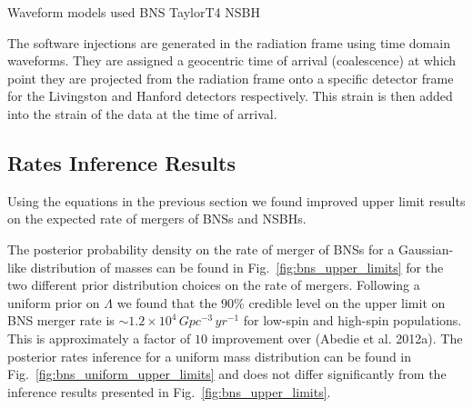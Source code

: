 
Waveform models used
BNS TaylorT4
NSBH 

The software injections are generated in the radiation frame using time domain waveforms. They are assigned a geocentric time of arrival (coalescence) at which point they are projected from the radiation frame onto a specific detector frame for the Livingston and Hanford detectors respectively. This strain is then added into the strain of the data at the time of arrival. 

\subsection{Rates Inference Results}
Using the equations in the previous section we found improved upper limit results on the expected rate of mergers of BNSs and NSBHs.

The posterior probability density on the rate of merger of BNSs for a Gaussian-like distribution of masses can be found in Fig.~\ref{fig:bns_upper_limits} for the two different prior distribution choices on the rate of mergers. Following a uniform prior on $\Lambda$ we found that the $90\%$ credible level on the upper limit on BNS merger rate is $\sim 1.2 \times 10^4 \, Gpc^{−3} \, yr^{−1}$ for low-spin and high-spin populations. This is approximately a factor of $10$ improvement over (Abedie et al. 2012a). The posterior rates inference for a uniform mass distribution can be found in Fig.~\ref{fig:bns_uniform_upper_limits} and does not differ significantly from the inference results presented in Fig.~\ref{fig:bns_upper_limits}.

